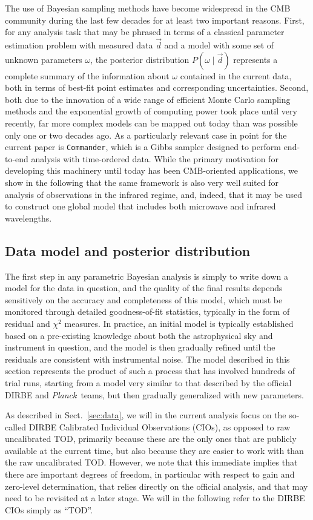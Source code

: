 \documentclass{aa}
\def\commander{\texttt{Commander}}
\def\Planck{\textit{Planck}}
\newcommand{\dv}[0]{\vec{d}}
\begin{document}
The use of Bayesian sampling methods have become widespread in the CMB
community during the last few decades for at least two important
reasons. First, for any analysis task that may be phrased in terms of
a classical parameter estimation problem with measured data $\dv$ and a
model with some set of unknown parameters $\omega$, the posterior
distribution $P(\omega\mid\dv)$ represents a complete summary of the
information about $\omega$ contained in the current data, both in
terms of best-fit point estimates and corresponding
uncertainties. Second, both due to the innovation of a wide range of
efficient Monte Carlo sampling methods and the exponential growth of
computing power took place until very recently, far more complex
models can be mapped out today than was possible only one or two
decades ago. As a particularly relevant case in point for the current
paper is \commander, which is a Gibbs sampler designed to perform
end-to-end analysis with time-ordered data. While the primary
motivation for developing this machinery until today has been
CMB-oriented applications, we show in the following that the same
framework is also very well suited for analysis of observations in the
infrared regime, and, indeed, that it may be used to construct one
global model that includes both microwave and infrared wavelengths.

\subsection{Data model and posterior distribution}
\label{sec:datamodel}

The first step in any parametric Bayesian analysis is simply to write
down a model for the data in question, and the quality of the final
results depends sensitively on the accuracy and completeness of this
model, which must be monitored through detailed goodness-of-fit
statistics, typically in the form of residual and $\chi^2$
measures. In practice, an initial model is typically established based
on a pre-existing knowledge about both the astrophysical sky and
instrument in question, and the model is then gradually refined until
the residuals are consistent with instrumental noise. The model
described in this section represents the product of such a process
that has involved hundreds of trial runs, starting from a model very
similar to that described by the official DIRBE and \Planck\ teams,
but then gradually generalized with new parameters.

As described in Sect.~\ref{sec:data}, we will in the current analysis
focus on the so-called DIRBE Calibrated Individual Observations
(CIOs), as opposed to raw uncalibrated TOD, primarily because these
are the only ones that are publicly available at the current time, but
also because they are easier to work with than the raw uncalibrated
TOD. However, we note that this immediate implies that there are
important degrees of freedom, in particular with respect to gain and
zero-level determination, that relies directly on the official
analysis, and that may need to be revisited at a later stage. We will
in the following refer to the DIRBE CIOs simply as ``TOD''.
\end{document}
